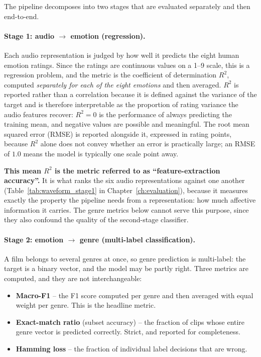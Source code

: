 The pipeline decomposes into two stages that are evaluated separately and then
end-to-end.

\paragraph{Stage 1: audio $\rightarrow$ emotion (regression).}
Each audio representation is judged by how well it predicts the eight human emotion
ratings. Since the ratings are continuous values on a 1--9 scale, this is a regression
problem, and the metric is the coefficient of determination $R^2$, computed
\emph{separately for each of the eight emotions} and then averaged. $R^2$ is reported
rather than a correlation because it is defined against the variance of the target and is
therefore interpretable as the proportion of rating variance the audio features recover:
$R^2 = 0$ is the performance of always predicting the training mean, and negative values
are possible and meaningful. The root mean squared error (RMSE) is reported alongside it,
expressed in rating points, because $R^2$ alone does not convey whether an error is
practically large; an RMSE of $1.0$ means the model is typically one scale point away.

\textbf{This mean $R^2$ is the metric referred to as ``feature-extraction accuracy''.} It
is what ranks the six audio representations against one another
(Table~\ref{tab:waveform_stage1} in Chapter~\ref{ch:evaluation}), because it measures
exactly the property the pipeline needs from a representation: how much affective
information it carries. The genre metrics below cannot serve this purpose, since they
also confound the quality of the second-stage classifier.

\paragraph{Stage 2: emotion $\rightarrow$ genre (multi-label classification).}
A film belongs to several genres at once, so genre prediction is multi-label: the target
is a binary vector, and the model may be partly right. Three metrics are computed, and
they are not interchangeable:

\begin{itemize}
  \item \textbf{Macro-F1} -- the F1 score computed per genre and then averaged with equal
    weight per genre. This is the headline metric.
  \item \textbf{Exact-match ratio} (subset accuracy) -- the fraction of clips whose entire
    genre vector is predicted correctly. Strict, and reported for completeness.
  \item \textbf{Hamming loss} -- the fraction of individual label decisions that are wrong.
\end{itemize}

